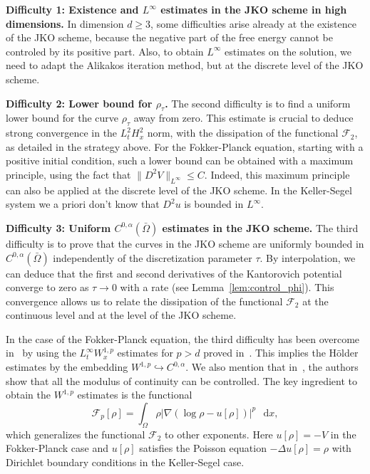 \documentclass[a4paper,twosided, 11pt]{article}
\renewcommand{\color}[2][]{}
\theoremstyle{plain}
\theoremstyle{remark}
\newcommand{\diff}{\mathop{}\!\mathrm{d}}
\numberwithin{equation}{section}
\begin{document}
\begin{itemize}{\color{blue}
    \item \textbf{Difficulty 1: Existence and $L^{\infty}$ estimates in the JKO scheme in high dimensions.} In dimension $d\ge 3$, some difficulties arise already at the existence of the JKO scheme, because the negative part of the free energy cannot be controled by its positive part. Also, to obtain $L^{\infty}$ estimates on the solution, we need to adapt the Alikakos iteration method, but at the discrete level of the JKO scheme. }
    
    \item \textbf{Difficulty 2: Lower bound for $\rho_{\tau}$.} The second difficulty is to find a uniform lower bound for the curve $\rho_{\tau}$ away from zero. This estimate is crucial to deduce strong convergence in the $L^2_t H^2_x$ norm, with the dissipation of the functional $\mathcal{F}_2$, as detailed in the strategy above. For the Fokker-Planck equation, starting with a positive initial condition, such a lower bound can be obtained with a maximum principle, using the fact that $\|D^2 V\|_{L^{\infty}} \leq C$. Indeed, this maximum principle can also be applied at the discrete level of the JKO scheme.{\color{blue} In the Keller-Segel system we a priori don't know that $D^2 u$ is bounded in $L^{\infty}$.}
    
    \item \textbf{Difficulty 3: Uniform $C^{0,\alpha}(\bar{\Omega})$ estimates in the JKO scheme.} The third difficulty is to prove that the curves in the JKO scheme are uniformly bounded in $C^{0,\alpha}(\bar{\Omega})$ independently of the discretization parameter $\tau$. By interpolation, we can deduce that the first and second derivatives of the Kantorovich potential converge to zero as $\tau \to 0$ with a rate (see Lemma~\ref{lem:control_phi}). This convergence allows us to relate the dissipation of the functional $\mathcal{F}_2$ at the continuous level and at the level of the JKO scheme.
\end{itemize}

In the case of the Fokker-Planck equation, the third difficulty has been overcome in~\cite{toshpulatov} by using the $L^{\infty}_{t}W^{1,p}_{x}$ estimates for $p > d$ proved in~\cite{dimarino}. This implies the Hölder estimates by the embedding $W^{1,p}\hookrightarrow C^{0,\alpha}$. We also mention that in~\cite{caillet2024fisher}, the authors show that all the modulus of continuity can be controlled. The key ingredient to obtain the $W^{1,p}$ estimates is the functional
\begin{equation}\label{eq:FP}
    \mathcal{F}_{p}[\rho] = \int_{\Omega}\rho \left|\nabla \left(\log \rho - u[\rho]\right)\right|^p \,\diff x,
\end{equation}
which generalizes the functional $\mathcal{F}_{2}$ to other exponents. Here $u[\rho] = -V$ in the Fokker-Planck case and $u[\rho]$ satisfies the Poisson equation $-\Delta u[\rho] = \rho$ with Dirichlet boundary conditions in the Keller-Segel case.
\end{document}
